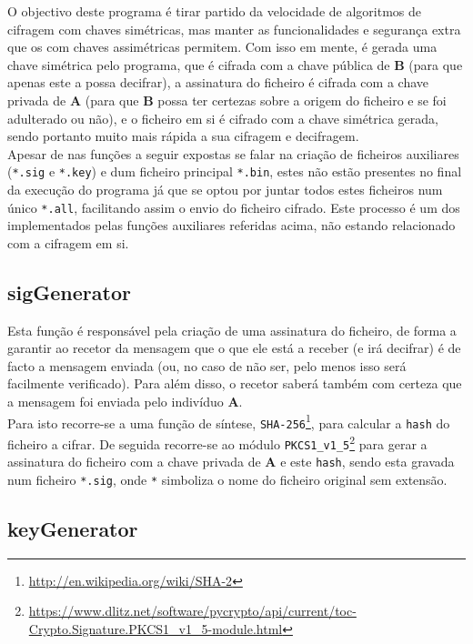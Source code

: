 \documentclass[a4paper,11pt,openright,oneside]{report}
\begin{document}
O objectivo deste programa é tirar partido da velocidade de algoritmos de cifragem com chaves simétricas, mas manter as funcionalidades e segurança extra que os com chaves assimétricas permitem. Com isso em mente, é gerada uma chave simétrica pelo programa, que é cifrada com a chave pública de \textbf{B} (para que apenas este a possa decifrar), a assinatura do ficheiro é cifrada com a chave privada de \textbf{A} (para que \textbf{B} possa ter certezas sobre a origem do ficheiro e se foi adulterado ou não), e o ficheiro em si é cifrado com a chave simétrica gerada, sendo portanto muito mais rápida a sua cifragem e decifragem.\\

Apesar de nas funções a seguir expostas se falar na criação de ficheiros auxiliares (\verb|*.sig| e \verb|*.key|) e dum ficheiro principal \verb|*.bin|, estes não estão presentes no final da execução do programa já que se optou por juntar todos estes ficheiros num único \verb|*.all|, facilitando assim o envio do ficheiro cifrado. Este processo é um dos implementados pelas funções auxiliares referidas acima, não estando relacionado com a cifragem em si.

\subsection{sigGenerator}

Esta função é responsável pela criação de uma assinatura do ficheiro, de forma a garantir ao recetor da mensagem que o que ele está a receber (e irá decifrar) é de facto a mensagem enviada (ou, no caso de não ser, pelo menos isso será facilmente verificado). Para além disso, o recetor saberá também com certeza que a mensagem foi enviada pelo indivíduo \textbf{A}.\\

Para isto recorre-se a uma função de síntese, \verb|SHA-256|\footnote{\url{http://en.wikipedia.org/wiki/SHA-2}}, para calcular a \verb|hash| do ficheiro a cifrar. De seguida recorre-se ao módulo \verb|PKCS1_v1_5|\footnote{\url{https://www.dlitz.net/software/pycrypto/api/current/toc-Crypto.Signature.PKCS1_v1_5-module.html}} para gerar a assinatura do ficheiro com a chave privada de \textbf{A} e este \verb|hash|, sendo esta gravada num ficheiro \verb|*.sig|, onde \verb|*| simboliza o nome do ficheiro original sem extensão.

\subsection{keyGenerator}
\end{document}
